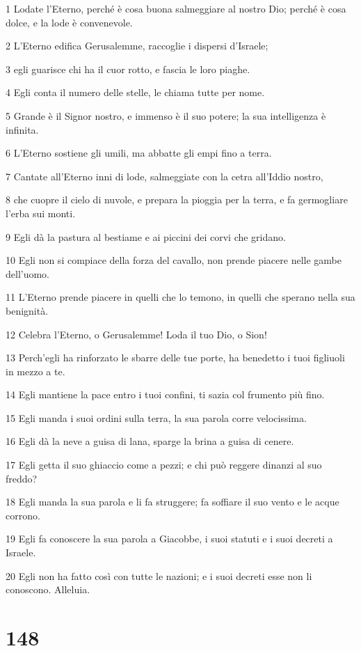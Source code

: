\par 1 Lodate l'Eterno, perché è cosa buona salmeggiare al nostro Dio; perché è cosa dolce, e la lode è convenevole.
\par 2 L'Eterno edifica Gerusalemme, raccoglie i dispersi d'Israele;
\par 3 egli guarisce chi ha il cuor rotto, e fascia le loro piaghe.
\par 4 Egli conta il numero delle stelle, le chiama tutte per nome.
\par 5 Grande è il Signor nostro, e immenso è il suo potere; la sua intelligenza è infinita.
\par 6 L'Eterno sostiene gli umili, ma abbatte gli empi fino a terra.
\par 7 Cantate all'Eterno inni di lode, salmeggiate con la cetra all'Iddio nostro,
\par 8 che cuopre il cielo di nuvole, e prepara la pioggia per la terra, e fa germogliare l'erba sui monti.
\par 9 Egli dà la pastura al bestiame e ai piccini dei corvi che gridano.
\par 10 Egli non si compiace della forza del cavallo, non prende piacere nelle gambe dell'uomo.
\par 11 L'Eterno prende piacere in quelli che lo temono, in quelli che sperano nella sua benignità.
\par 12 Celebra l'Eterno, o Gerusalemme! Loda il tuo Dio, o Sion!
\par 13 Perch'egli ha rinforzato le sbarre delle tue porte, ha benedetto i tuoi figliuoli in mezzo a te.
\par 14 Egli mantiene la pace entro i tuoi confini, ti sazia col frumento più fino.
\par 15 Egli manda i suoi ordini sulla terra, la sua parola corre velocissima.
\par 16 Egli dà la neve a guisa di lana, sparge la brina a guisa di cenere.
\par 17 Egli getta il suo ghiaccio come a pezzi; e chi può reggere dinanzi al suo freddo?
\par 18 Egli manda la sua parola e li fa struggere; fa soffiare il suo vento e le acque corrono.
\par 19 Egli fa conoscere la sua parola a Giacobbe, i suoi statuti e i suoi decreti a Israele.
\par 20 Egli non ha fatto così con tutte le nazioni; e i suoi decreti esse non li conoscono. Alleluia.

\chapter{148}

